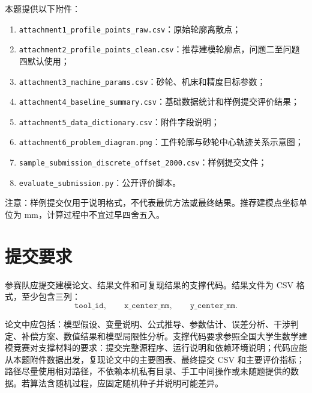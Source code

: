 \documentclass[UTF8,a4paper,11pt]{ctexart}
\begin{document}
本题提供以下附件：
\begin{enumerate}
  \item \texttt{attachment1\_profile\_points\_raw.csv}：原始轮廓离散点；
  \item \texttt{attachment2\_profile\_points\_clean.csv}：推荐建模轮廓点，问题二至问题四默认使用；
  \item \texttt{attachment3\_machine\_params.csv}：砂轮、机床和精度目标参数；
  \item \texttt{attachment4\_baseline\_summary.csv}：基础数据统计和样例提交评价结果；
  \item \texttt{attachment5\_data\_dictionary.csv}：附件字段说明；
  \item \texttt{attachment6\_problem\_diagram.png}：工件轮廓与砂轮中心轨迹关系示意图；
  \item \texttt{sample\_submission\_discrete\_offset\_2000.csv}：样例提交文件；
  \item \texttt{evaluate\_submission.py}：公开评价脚本。
\end{enumerate}

注意：样例提交仅用于说明格式，不代表最优方法或最终结果。推荐建模点坐标单位为 mm，计算过程中不宜过早四舍五入。

\section*{提交要求}

参赛队应提交建模论文、结果文件和可复现结果的支撑代码。结果文件为 CSV 格式，至少包含三列：
\[
\texttt{tool\_id},\qquad \texttt{x\_center\_mm},\qquad \texttt{y\_center\_mm}.
\]

论文中应包括：模型假设、变量说明、公式推导、参数估计、误差分析、干涉判定、补偿方案、数值结果和模型局限性分析。支撑代码要求参照全国大学生数学建模竞赛对支撑材料的要求：提交完整源程序、运行说明和依赖环境说明；代码应能从本题附件数据出发，复现论文中的主要图表、最终提交 CSV 和主要评价指标；路径尽量使用相对路径，不依赖本机私有目录、手工中间操作或未随题提供的数据。若算法含随机过程，应固定随机种子并说明可能差异。
\end{document}
